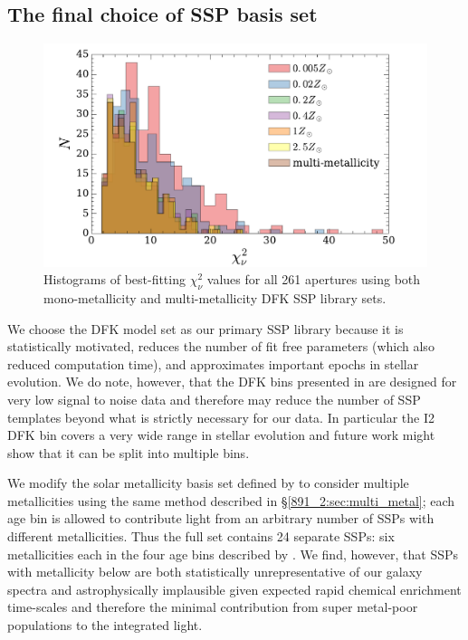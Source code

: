 \subsection{The final choice of SSP basis set}
\label{891_2:sec:final_SSP}
\begin{figure}
  \centering
  \includegraphics[width=\columnwidth]{891_2/figs/dfk_chihist.pdf}
  \caption[$\chi_{\nu}^2$ distributions for different metallicity
    fits]{\fixspacing\label{891_2:fig:chisq_hist}Histograms of
    best-fitting $\chi^2_\nu$ values for all 261 apertures using both
    mono-metallicity and multi-metallicity DFK SSP library sets.}
\end{figure}

We choose the  DFK model set as our primary SSP
library because it is statistically motivated, reduces the number of
fit free parameters (which also reduced computation time), and
approximates important epochs in stellar evolution. We do note,
however, that the DFK bins presented in  are
designed for very low signal to noise data and therefore may reduce
the number of SSP templates beyond what is strictly necessary for our
data. In particular the I2 DFK bin covers a very wide range in stellar
evolution and future work might show that it can be split into
multiple bins.


We modify the solar metallicity basis set defined by
 to consider multiple metallicities using the same
method described in \S\ref{891_2:sec:multi_metal}; each age bin is allowed to
contribute light from an arbitrary number of SSPs with different
metallicities. Thus the full set contains 24 separate SSPs: six
metallicities each in the four age bins described by
. We find, however, that SSPs with metallicity
below  are both statistically unrepresentative of our
galaxy spectra and astrophysically   implausible given
expected rapid chemical enrichment time-scales and therefore the
minimal contribution from super metal-poor populations to the
integrated light.

